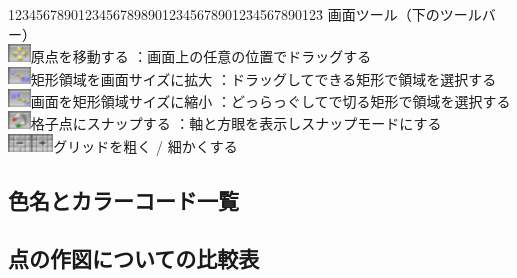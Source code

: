 \documentclass[papersize,a4paper,12pt,uplatex]{jsarticle}
\begin{document}
 \begin{tabbing}
1234567890123456789890123456789012\=34567890123\=\kill
画面ツール（下のツールバー）\\
\includegraphics[bb=0 0 6.48 5.04 , width=0.6cm]{Fig/translate-view.pdf}原点を移動する \>：画面上の任意の位置でドラッグする\\
\includegraphics[bb=0 0 6.48 5.04 , width=0.6cm]{Fig/zoom-in.pdf}矩形領域を画面サイズに拡大 \>：ドラッグしてできる矩形で領域を選択する\\
\includegraphics[bb=0 0 6.48 5.04 , width=0.6cm]{Fig/zoom-out.pdf}画面を矩形領域サイズに縮小 \>：どっらっぐしてで切る矩形で領域を選択する\\
\includegraphics[bb=0 0 6.48 5.04 , width=0.6cm]{Fig/snap.pdf}格子点にスナップする \>：軸と方眼を表示しスナップモードにする\\
\includegraphics[bb=0 0 6.48 5.04 , width=0.6cm]{Fig/grid-more.pdf}\includegraphics[bb=0 0 6.48 5.04 , width=0.6cm]{Fig/grid-less.pdf}グリッドを粗く / 細かくする\\
 \end{tabbing}

\hypertarget{colorcodelist}{}
\subsection{色名とカラーコード一覧}
\vspace{\baselineskip}
\scalebox{0.9}{}

\newpage
\hypertarget{mkpttable}{}
\subsection{点の作図についての比較表}
\vspace{\baselineskip}
\scalebox{0.9}{}
\end{document}
